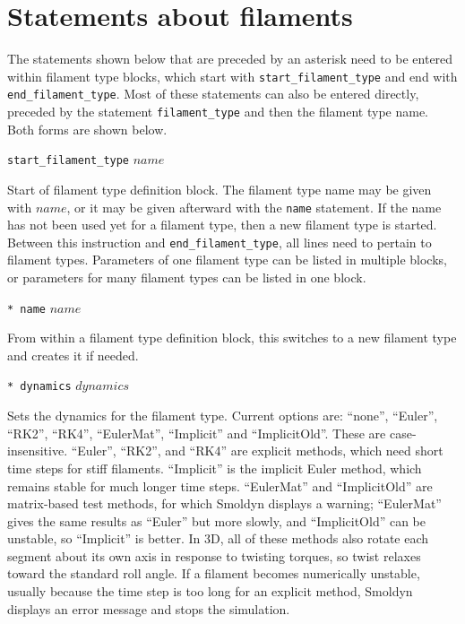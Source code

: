 \documentclass {scrbook}
\newcommand {\ttt} {\texttt}
\begin{document}
\section{Statements about filaments}

The statements shown below that are preceded by an asterisk need to be entered within filament type blocks, which start with \ttt{start\_filament\_type} and end with \ttt{end\_filament\_type}. Most of these statements can also be entered directly, preceded by the statement \ttt{filament\_type} and then the filament type name. Both forms are shown below.

\begin{description}

\item{\ttt{start\_filament\_type} $name$}

Start of filament type definition block. The filament type name may be given with $name$, or it may be given afterward with the \ttt{name} statement. If the name has not been used yet for a filament type, then a new filament type is started. Between this instruction and \ttt{end\_filament\_type}, all lines need to pertain to filament types. Parameters of one filament type can be listed in multiple blocks, or parameters for many filament types can be listed in one block.

\item{\ttt{* name} $name$}

From within a filament type definition block, this switches to a new filament type and creates it if needed.

\item{\ttt{* dynamics} $dynamics$}

Sets the dynamics for the filament type. Current options are: ``none'', ``Euler'', ``RK2'', ``RK4'', ``EulerMat'', ``Implicit'' and ``ImplicitOld''. These are case-insensitive. ``Euler'', ``RK2'', and ``RK4'' are explicit methods, which need short time steps for stiff filaments. ``Implicit'' is the implicit Euler method, which remains stable for much longer time steps. ``EulerMat'' and ``ImplicitOld'' are matrix-based test methods, for which Smoldyn displays a warning; ``EulerMat'' gives the same results as ``Euler'' but more slowly, and ``ImplicitOld'' can be unstable, so ``Implicit'' is better. In 3D, all of these methods also rotate each segment about its own axis in response to twisting torques, so twist relaxes toward the standard roll angle. If a filament becomes numerically unstable, usually because the time step is too long for an explicit method, Smoldyn displays an error message and stops the simulation.


\end{description}
\end{document}
